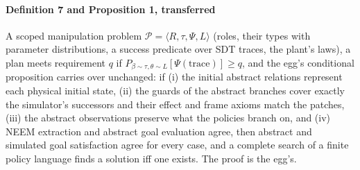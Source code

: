 \documentclass[10.5pt,a4paper]{article}
\begin{document}
\paragraph{Definition 7 and Proposition 1, transferred} A scoped manipulation problem
$\mathcal{P}=\langle R,\tau,\Psi,L\rangle$ (roles, their types with parameter distributions, a success predicate over SDT
traces, the plant's laws), a plan meets requirement $q$ if $P_{\beta\sim\tau,\theta\sim L}[\Psi(\mathrm{trace})]\ge q$,
and the egg's conditional proposition carries over unchanged: if (i) the initial abstract relations represent each
physical initial state, (ii) the guards of the abstract branches cover exactly the simulator's successors and their
effect and frame axioms match the patches, (iii) the abstract observations preserve what the policies branch on, and
(iv) NEEM extraction and abstract goal evaluation agree, then abstract and simulated goal satisfaction agree for every
case, and a complete search of a finite policy language finds a solution iff one exists. The proof is the egg's.
\end{document}
